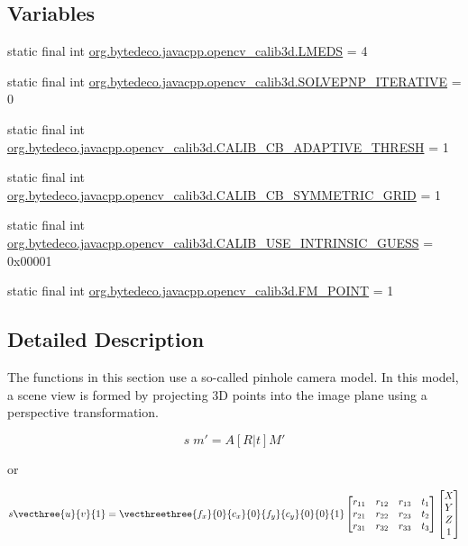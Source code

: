 \subsection*{Variables}
\begin{DoxyCompactItemize}
\item 
static final int \hyperlink{group__calib3d_ga7e1c52453b9e9c9ab4bad14cda6c4bf0}{org.\+bytedeco.\+javacpp.\+opencv\+\_\+calib3d.\+L\+M\+E\+DS} = 4
\item 
static final int \hyperlink{group__calib3d_ga6ffcad9be73e952b7d77514029955df4}{org.\+bytedeco.\+javacpp.\+opencv\+\_\+calib3d.\+S\+O\+L\+V\+E\+P\+N\+P\+\_\+\+I\+T\+E\+R\+A\+T\+I\+VE} = 0
\item 
static final int \hyperlink{group__calib3d_gafb359ad540f439e22ec524accd18035a}{org.\+bytedeco.\+javacpp.\+opencv\+\_\+calib3d.\+C\+A\+L\+I\+B\+\_\+\+C\+B\+\_\+\+A\+D\+A\+P\+T\+I\+V\+E\+\_\+\+T\+H\+R\+E\+SH} = 1
\item 
static final int \hyperlink{group__calib3d_gad2f624be59f3f688026e8da4a9fdd54f}{org.\+bytedeco.\+javacpp.\+opencv\+\_\+calib3d.\+C\+A\+L\+I\+B\+\_\+\+C\+B\+\_\+\+S\+Y\+M\+M\+E\+T\+R\+I\+C\+\_\+\+G\+R\+ID} = 1
\item 
static final int \hyperlink{group__calib3d_gaf431715014a51d3ef90634667102d383}{org.\+bytedeco.\+javacpp.\+opencv\+\_\+calib3d.\+C\+A\+L\+I\+B\+\_\+\+U\+S\+E\+\_\+\+I\+N\+T\+R\+I\+N\+S\+I\+C\+\_\+\+G\+U\+E\+SS} = 0x00001
\item 
static final int \hyperlink{group__calib3d_ga9409961aa623a3fc37210e6b332447fa}{org.\+bytedeco.\+javacpp.\+opencv\+\_\+calib3d.\+F\+M\+\_\+P\+O\+I\+NT} = 1
\end{DoxyCompactItemize}


\subsection{Detailed Description}
The functions in this section use a so-\/called pinhole camera model. In this model, a scene view is formed by projecting 3D points into the image plane using a perspective transformation. 

\[s \; m' = A [R|t] M'\] 

or 

\[s \vecthree{u}{v}{1} = \vecthreethree{f_x}{0}{c_x}{0}{f_y}{c_y}{0}{0}{1} \begin{bmatrix} r_{11} & r_{12} & r_{13} & t_1 \\ r_{21} & r_{22} & r_{23} & t_2 \\ r_{31} & r_{32} & r_{33} & t_3 \end{bmatrix} \begin{bmatrix} X \\ Y \\ Z \\ 1 \end{bmatrix}\] 

